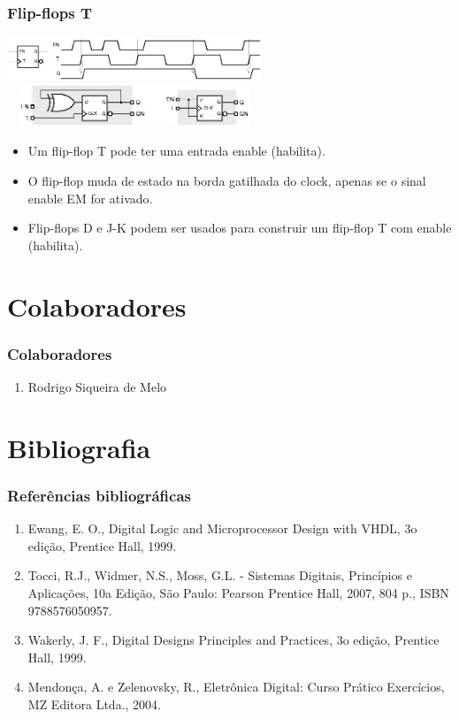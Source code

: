 \documentclass{beamer}
\begin{document}
\begin{frame}
  \frametitle{Flip-flops T}
  \begin{center}
  \includegraphics[height = 0.5in, width = 3in]{slide29_filomeno}\\
  \includegraphics[height = 0.5in, width = 3in]{slide29_filomeno2}
 \end{center} 
 \begin{itemize}
  \item Um flip-flop T pode ter uma entrada enable (habilita).\pause
  \item O flip-flop muda de estado na borda gatilhada do clock, apenas se o sinal enable EM for ativado.\pause
  \item Flip-flops D e J-K podem ser usados para construir um flip-flop T com enable (habilita).
 \end{itemize}
\end{frame}

\section{Colaboradores}
\begin{frame}
 \frametitle{Colaboradores}
 \begin{enumerate}
  \item Rodrigo Siqueira de Melo
 \end{enumerate}
\end{frame}

\section{Bibliografia}
\begin{frame}
 \frametitle{Referências bibliográficas}
 \begin{enumerate}
  \item Ewang, E. O., Digital Logic and Microprocessor Design with VHDL, 3o edição, Prentice Hall, 1999.
  \item Tocci, R.J., Widmer, N.S., Moss, G.L. - Sistemas Digitais, Princípios e   Aplicações, 10a Edição, São Paulo: Pearson Prentice Hall, 2007, 804 p., ISBN 9788576050957.
  \item Wakerly, J. F., Digital Designs Principles and Practices, 3o edição, Prentice Hall, 1999.
  \item Mendonça, A. e Zelenovsky, R., Eletrônica Digital: Curso Prático  Exercícios, MZ Editora Ltda., 2004.
 \end{enumerate}
\end{frame}
\end{document}
